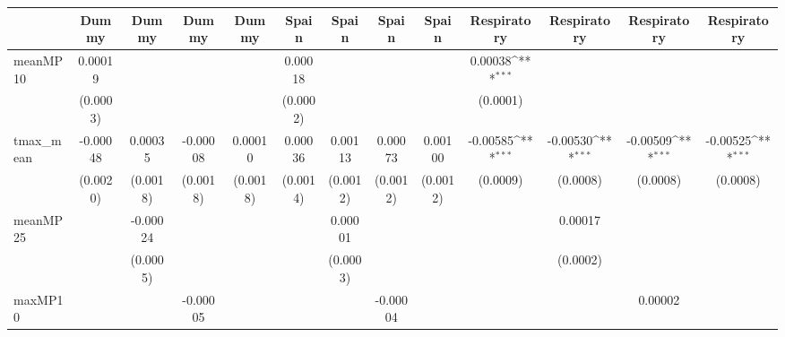 {
\def\sym#1{\ifmmode^{#1}\else\(^{#1}\)\fi}
\begin{tabular}{l*{12}{c}}
\toprule
            &\multicolumn{1}{c}{Dummy}&\multicolumn{1}{c}{Dummy}&\multicolumn{1}{c}{Dummy}&\multicolumn{1}{c}{Dummy}&\multicolumn{1}{c}{Spain}&\multicolumn{1}{c}{Spain}&\multicolumn{1}{c}{Spain}&\multicolumn{1}{c}{Spain}&\multicolumn{1}{c}{Respiratory}&\multicolumn{1}{c}{Respiratory}&\multicolumn{1}{c}{Respiratory}&\multicolumn{1}{c}{Respiratory}\\
\midrule
meanMP10    &     0.00019         &                     &                     &                     &     0.00018         &                     &                     &                     &     0.00038\sym{***}&                     &                     &                     \\
            &    (0.0003)         &                     &                     &                     &    (0.0002)         &                     &                     &                     &    (0.0001)         &                     &                     &                     \\
tmax\_mean   &    -0.00048         &     0.00035         &    -0.00008         &     0.00010         &     0.00036         &     0.00113         &     0.00073         &     0.00100         &    -0.00585\sym{***}&    -0.00530\sym{***}&    -0.00509\sym{***}&    -0.00525\sym{***}\\
            &    (0.0020)         &    (0.0018)         &    (0.0018)         &    (0.0018)         &    (0.0014)         &    (0.0012)         &    (0.0012)         &    (0.0012)         &    (0.0009)         &    (0.0008)         &    (0.0008)         &    (0.0008)         \\
meanMP25    &                     &    -0.00024         &                     &                     &                     &     0.00001         &                     &                     &                     &     0.00017         &                     &                     \\
            &                     &    (0.0005)         &                     &                     &                     &    (0.0003)         &                     &                     &                     &    (0.0002)         &                     &                     \\
maxMP10     &                     &                     &    -0.00005         &                     &                     &                     &    -0.00004         &                     &                     &                     &     0.00002         &                     \\

\end{tabular}}
